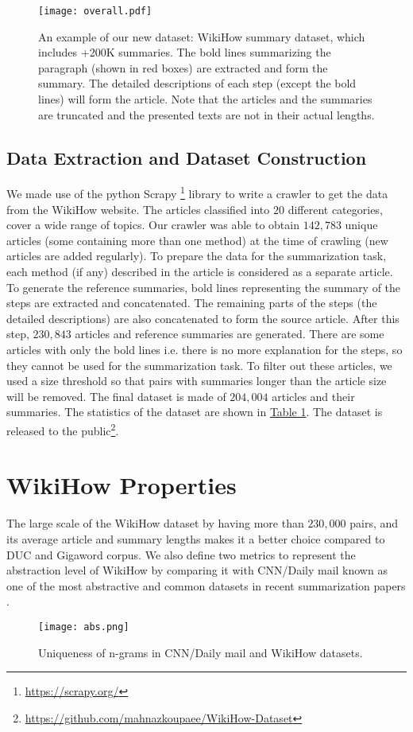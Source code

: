 \documentclass[11pt,a4paper]{article}
\begin{document}
\begin{figure*}[t]
  \centering    
  \texttt{[image: overall.pdf]}
\caption{An example of our new dataset: WikiHow summary dataset, which includes +200K summaries. The bold lines summarizing the paragraph (shown in red boxes) are extracted and form the summary. The detailed descriptions of each step (except the bold lines) will form the article. Note that the articles and the summaries are truncated and the presented texts are not in their actual lengths.}
  \label{fig:wikihow}
\end{figure*}


\subsection{Data Extraction and Dataset Construction}
We made use of the python Scrapy \footnote{\url{https://scrapy.org/}} library to write a crawler to get the data from the WikiHow website. The articles classified into $20$ different categories, cover a wide range of topics. Our crawler was able to obtain $142,783$ unique articles (some containing more than one method) at the time of crawling (new articles are added regularly). 
To prepare the data for the summarization task, each method (if any) described in the article is considered as a separate article. To generate the reference summaries, bold lines representing the summary of the steps are extracted and concatenated. The remaining parts of the steps (the detailed descriptions) are also concatenated to form the source article. After this step, $230,843$ articles and reference summaries are generated. 
There are some articles with only the bold lines i.e. there is no more explanation for the steps, so they cannot be used for the summarization task. To filter out these articles, we used a size threshold so that pairs with summaries longer than the article size will be removed. The final dataset is made of $204,004$ articles and their summaries. 
The statistics of the dataset are shown in \hyperref[tbl:1]{Table 1}. The dataset is released to the public\footnote{\url{https://github.com/mahnazkoupaee/WikiHow-Dataset}}.

\section{WikiHow Properties}
The large scale of the WikiHow dataset by having more than $230,000$ pairs, and its average article and summary lengths makes it a better choice compared to DUC and Gigaword corpus.
We also define two metrics to represent the abstraction level of WikiHow by comparing it with CNN/Daily mail known as one of the most abstractive and common datasets in recent summarization papers \cite{nallapati2016abstractive,nallapati2017summarunner,see2017get,paulus2017deep}.
\begin{figure}
  \centering    
  \texttt{[image: abs.png]}
\caption{Uniqueness of n-grams in CNN/Daily mail and WikiHow datasets.}
  \label{fig:abstract}
  \vspace*{-2mm}
\end{figure}
\end{document}
